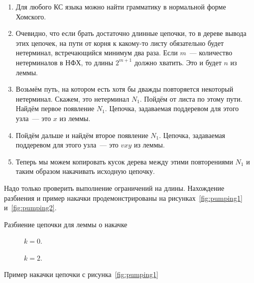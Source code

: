 \begin{proofSketch}
    \begin{enumerate}
        \item Для любого КС языка можно найти грамматику в нормальной форме Хомского.
        \item Очевидно, что если брать достаточно длинные цепочки, то в дереве вывода этих цепочек, на пути от корня к какому-то листу обязательно будет нетерминал, встречающийся минимум два раза. Если $m$~--- количество нетерминалов в НФХ, то длины $2^{m+1}$ должно хватить. Это и будет $n$ из леммы.
        \item Возьмём путь, на котором есть хотя бы дважды повторяется некоторый нетерминал. Скажем, это нетерминал  $N_1$. Пойдём от листа по этому пути. Найдём первое появление $N_1$. Цепочка, задаваемая поддеревом для этого узла~--- это $x$ из леммы.
        \item Пойдём дальше и найдём второе появление $N_1$. Цепочка, задаваемая поддеревом для этого узла~--- это $vxy$ из леммы.
        \item Теперь мы можем копировать кусок дерева между этими повторениями $N_1$ и таким образом накачивать исходную цепочку.
    \end{enumerate}
    Надо только проверить выполнение ограничений на длины.
    Нахождение разбиения и пример накачки продемонстрированы на рисунках~\ref{fig:pumping1} и~\ref{fig:pumping2}.
\end{proofSketch}

\begin{marginfigure}
    \centering
    
    \caption{Разбиение цепочки для леммы о накачке}
    \label{fig:pumping1}
\end{marginfigure}

\begin{marginfigure}
    \begin{center}
    \begin{subfigure}{\marginparwidth}
        \centering
        
        \caption{$k = 0$.}
    \end{subfigure}
    
    \begin{subfigure}{\linewidth}
        \centering
        
        \caption{$k = 2$.}
    \end{subfigure}
\end{center}
    \caption{Пример накачки цепочки с рисунка~\ref{fig:pumping1}}
    \label{fig:pumping2}
\end{marginfigure}

